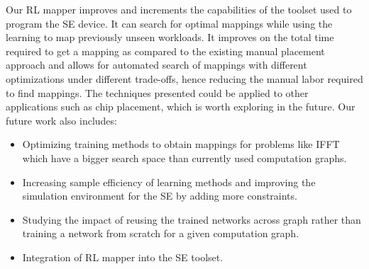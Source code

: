 Our RL mapper improves and increments the capabilities of the toolset used to program the SE device. 
It can search for optimal mappings while using the learning to map previously unseen workloads. 
It improves on the total time required to get a mapping as compared to the existing manual placement approach and allows for automated search of mappings with different optimizations under different trade-offs, hence reducing the manual labor required to find mappings. 
The techniques presented could be applied to other applications such as chip placement, which is worth exploring in the future. 
Our future work also includes: 
\begin{itemize}
    \item Optimizing training methods to obtain mappings for problems like IFFT which have a bigger search space than currently used computation graphs. 
    \item Increasing sample efficiency of learning methods and improving the simulation environment for the SE by adding more constraints. 
    \item Studying the impact of reusing the trained networks across graph rather than training a network from scratch for a given computation graph.
    \item Integration of RL mapper into the SE toolset.
\end{itemize}